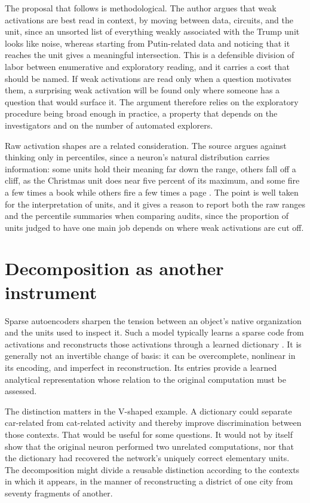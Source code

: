 \documentclass[11pt]{article}
\begin{document}
The proposal that follows is methodological. The author argues that weak activations are best read in context, by moving between data, circuits, and the unit, since an unsorted list of everything weakly associated with the Trump unit looks like noise, whereas starting from Putin-related data and noticing that it reaches the unit gives a meaningful intersection. This is a defensible division of labor between enumerative and exploratory reading, and it carries a cost that should be named. If weak activations are read only when a question motivates them, a surprising weak activation will be found only where someone has a question that would surface it. The argument therefore relies on the exploratory procedure being broad enough in practice, a property that depends on the investigators and on the number of automated explorers.

Raw activation shapes are a related consideration. The source argues against thinking only in percentiles, since a neuron's natural distribution carries information: some units hold their meaning far down the range, others fall off a cliff, as the Christmas unit does near five percent of its maximum, and some fire a few times a book while others fire a few times a page \cite[\emph{Do Weak Activations Matter?}]{cammarata}. The point is well taken for the interpretation of units, and it gives a reason to report both the raw ranges and the percentile summaries when comparing audits, since the proportion of units judged to have one main job depends on where weak activations are cut off.

\section{Decomposition as another instrument}

Sparse autoencoders sharpen the tension between an object's native organization and the units used to inspect it. Such a model typically learns a sparse code from activations and reconstructs those activations through a learned dictionary \cite{gao2024,bricken2023}. It is generally not an invertible change of basis: it can be overcomplete, nonlinear in its encoding, and imperfect in reconstruction. Its entries provide a learned analytical representation whose relation to the original computation must be assessed.

The distinction matters in the V-shaped example. A dictionary could separate car-related from cat-related activity and thereby improve discrimination between those contexts. That would be useful for some questions. It would not by itself show that the original neuron performed two unrelated computations, nor that the dictionary had recovered the network's uniquely correct elementary units. The decomposition might divide a reusable distinction according to the contexts in which it appears, in the manner of reconstructing a district of one city from seventy fragments of another.
\end{document}
